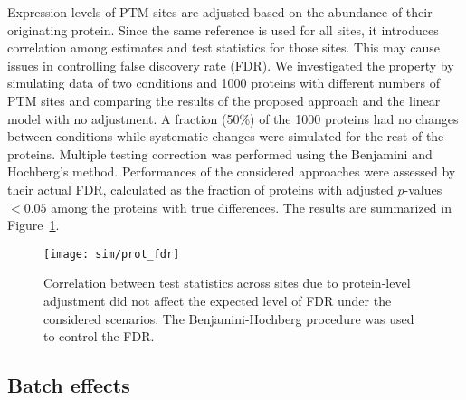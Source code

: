 \documentclass{mcp}
\def\sfigref#1{{Figure~\ref{#1}}}
\begin{document}
Expression levels of PTM sites are adjusted based on the abundance of their originating protein. Since the same reference is used for all sites, it introduces correlation among estimates and test statistics for those sites. This may cause issues in controlling false discovery rate (FDR).
We investigated the property by simulating data of two conditions and 1000 proteins with different numbers of PTM sites and comparing the results of the proposed approach and the linear model with no adjustment. 
A fraction (50\%) of the 1000 proteins had no changes between conditions while systematic changes were simulated for the rest of the proteins. Multiple testing correction was performed using the Benjamini and Hochberg's method. 
Performances of the considered approaches were assessed by their actual FDR, calculated as the fraction of proteins with adjusted $p$-values $<0.05$ among the proteins with true differences. The results are summarized in \sfigref{fig:prot_fdr}.

\begin{figure}[h!]
\centering
\texttt{[image: sim/prot\_fdr]}
\caption{Correlation between test statistics across sites due to protein-level adjustment did not affect the expected level of FDR under the considered scenarios. The Benjamini-Hochberg procedure was used to control the FDR. \label{fig:prot_fdr}}
\end{figure}


\clearpage
\subsection{Batch effects}
\end{document}
